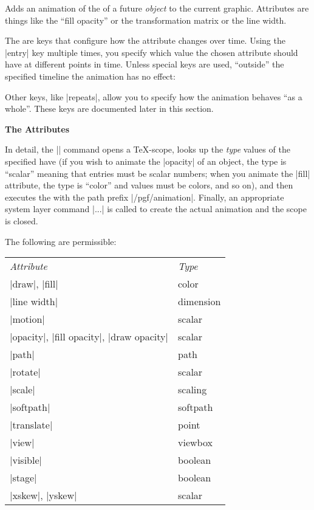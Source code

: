 \begin{command}{\pgfanimateattribute{}}
    Adds an animation of the  of a future \emph{object} to the
    current graphic. Attributes are things like the ``fill opacity'' or the
    transformation matrix or the line width.

    The  are keys that configure how the attribute changes over
    time. Using the |entry| key multiple times, you specify which value the
    chosen attribute should have at different points in time. Unless special
    keys are used, ``outside'' the specified timeline the animation has no
    effect:
\begin{codeexample}[animation list={0.5,1,1.5,2,2.5}]
\end{codeexample}

    Other keys, like |repeats|, allow you to specify how the animation behaves
    ``as a whole''. These keys are documented later in this section.


    \medskip
    \textbf{The Attributes}

    In detail, the |\pgfanimateattribute| command opens a \TeX-scope, looks up
    the \emph{type} values of the specified  have (if you wish
    to animate the |opacity| of an object, the type is ``scalar'' meaning that
    entries must be scalar numbers; when you animate the |fill| attribute, the
    type is ``color'' and values must be colors, and so on), and then executes
    the  with the path prefix |/pgf/animation|. Finally, an
    appropriate system layer command |\pgfsysanimate...| is called to create
    the actual animation and the scope is closed.

    The following  are permissible:

    \begin{tabular}{ll}
        \emph{Attribute}  & \emph{Type} \\
        |draw|, |fill|    & color \\
        |line width|      & dimension \\
        |motion|          & scalar \\
        |opacity|, |fill opacity|, |draw opacity| & scalar \\
        |path|            & path \\
        |rotate|          & scalar \\
        |scale|           & scaling \\
        |softpath|        & softpath \\
        |translate|       & point \\
        |view|            & viewbox \\
        |visible|         & boolean \\
        |stage|           & boolean \\
        |xskew|, |yskew|  & scalar \\
    \end{tabular}


\end{command}

